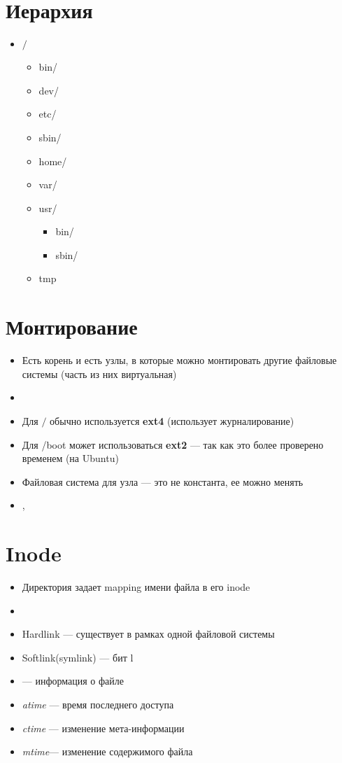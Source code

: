 \documentclass[../lectures.tex]{subfiles}
\begin{document}
\section{Иерархия}
\begin{itemize}
    \item $/$
        \begin{itemize}
            \item bin/
            \item dev/
            \item etc/
            \item sbin/
            \item home/
            \item var/
            \item usr/
                \begin{itemize}
                    \item bin/
                    \item sbin/
                \end{itemize}
            \item tmp
        \end{itemize}
\end{itemize}
\section{Монтирование}
\begin{itemize}
    \item Есть корень и есть узлы, в которые можно монтировать другие файловые системы (часть из них виртуальная)
    \item {}
    \item Для $/$ обычно используется \textbf{ext4} (использует журналирование)
    \item Для /boot может использоваться \textbf{ext2} --- так как это более проверено временем (на Ubuntu)
    \item Файловая система для узла --- это не константа, ее можно менять
    \item {}, 
\end{itemize}
\section{Inode}
\begin{itemize}
    \item Директория задает mapping имени файла в его inode
    \item {}
    \item Hardlink --- существует в рамках одной файловой системы
    \item Softlink(symlink) --- бит l
    \item {} --- информация о файле
    \item \emph{atime} --- время последнего доступа
    \item \emph{ctime} --- изменение мета-информации
    \item \emph{mtime}--- изменение содержимого файла
\end{itemize}
\end{document}
